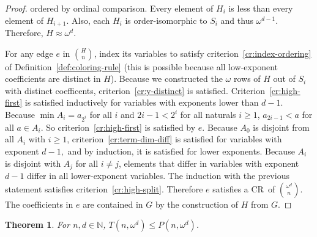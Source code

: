 \documentclass[10pt,a4paper]{article}
\newcommand{\om}{\omega}
\newcommand{\oequiv}{\approx}
\newcommand{\N}{\mathbb{N}}
\newcommand{\crulenospace}{CR}
\newcommand{\crule}{\crulenospace~}
\newcommand{\numpoints}{n}
\newcommand{\commonconst}{a}
\newcommand{\Commonconst}{A}
\theoremstyle{plain}
\newtheorem{theorem}{Theorem}[section]
\theoremstyle{definition}
\begin{document}
\begin{proof}
ordered by ordinal comparison. Every element of $H_i$ is less than every element of $H_{i+1}$. Also, each $H_i$ is order-isomorphic to $S_i$ and thus $\omega^{d-1}$.
Therefore, $H \oequiv \om^{d}$.

For any edge $e$ in $\binom{H}{\numpoints}$, index its variables to satisfy criterion~\ref{cr:index-ordering} of Definition~\ref{def:coloring-rule} (this is possible because all low-exponent coefficients are distinct in $H$).
Because we constructed the $\om$ rows of $H$ out of $S_i$ with distinct coefficents,
criterion~\ref{cr:y-distinct} is satisfied.
Criterion~\ref{cr:high-first} 
is satisfied inductively for variables with exponents lower than $d-1$. Because $\min \Commonconst_i = \commonconst_{2^i}$ for all $i$ and $2i-1 < 2^i$ for all naturals
$i \geq 1$, $\commonconst_{2i-1}<\commonconst$ for all $\commonconst \in \Commonconst_i$. So criterion~\ref{cr:high-first} is satisfied by $e$. Because $\Commonconst_0$ is disjoint from all $\Commonconst_i$ with $i \geq 1$, criterion~\ref{cr:term-dim-diff} is satisfied for variables with exponent $d-1,$ and by induction, it is satisfied for lower exponents. Because $\Commonconst_i$ is disjoint with $\Commonconst_j$ for all $i \neq j$, elements that differ in variables with exponent $d-1$ differ in all lower-exponent variables. The induction with the previous statement satisfies criterion~\ref{cr:high-split}. Therefore $e$ satisfies a \crule of $\binom{\om^d}{\numpoints}$. The coefficients in $e$ are contained in $G$ by the construction of $H$ from $G$.
\end{proof}

\begin{theorem}\label{th:wd-LT}
For $\numpoints,d \in \N$, $T\left(\numpoints, \om^d\right) \leq P\left(\numpoints, \om^d\right)$.
\end{theorem} 
\end{document}
